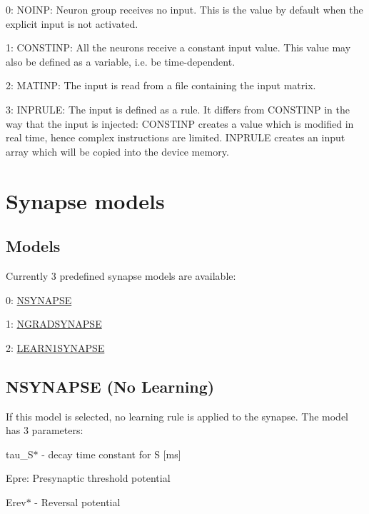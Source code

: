 \begin{DoxyItemize}
\item 0\+: N\+O\+I\+N\+P\+: Neuron group receives no input. This is the value by default when the explicit input is not activated.
\item 1\+: C\+O\+N\+S\+T\+I\+N\+P\+: All the neurons receive a constant input value. This value may also be defined as a variable, i.\+e. be time-\/dependent.
\item 2\+: M\+A\+T\+I\+N\+P\+: The input is read from a file containing the input matrix.
\item 3\+: I\+N\+P\+R\+U\+L\+E\+: The input is defined as a rule. It differs from C\+O\+N\+S\+T\+I\+N\+P in the way that the input is injected\+: C\+O\+N\+S\+T\+I\+N\+P creates a value which is modified in real time, hence complex instructions are limited. I\+N\+P\+R\+U\+L\+E creates an input array which will be copied into the device memory. 
\end{DoxyItemize}\hypertarget{sect3}{}\section{Synapse models}\label{sect3}
\hypertarget{sect3_subsect31}{}\subsection{Models}\label{sect3_subsect31}
Currently 3 predefined synapse models are available\+:
\begin{DoxyItemize}
\item 0\+: \hyperlink{sect3_sect31}{N\+S\+Y\+N\+A\+P\+S\+E}
\item 1\+: \hyperlink{sect3_sect32}{N\+G\+R\+A\+D\+S\+Y\+N\+A\+P\+S\+E}
\item 2\+: \hyperlink{sect3_sect33}{L\+E\+A\+R\+N1\+S\+Y\+N\+A\+P\+S\+E}
\end{DoxyItemize}\hypertarget{sect3_sect31}{}\subsection{N\+S\+Y\+N\+A\+P\+S\+E (\+No Learning)}\label{sect3_sect31}
If this model is selected, no learning rule is applied to the synapse. The model has 3 parameters\+:
\begin{DoxyItemize}
\item {\ttfamily tau\+\_\+\+S$\ast$} -\/ decay time constant for S \mbox{[}ms\mbox{]}
\item {\ttfamily Epre\+:} Presynaptic threshold potential
\item {\ttfamily Erev$\ast$} -\/ Reversal potential
\end{DoxyItemize}

